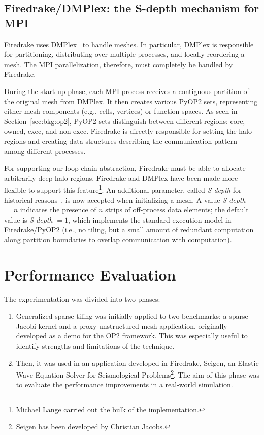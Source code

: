 \subsection{Firedrake/DMPlex: the S-depth mechanism for MPI}
\label{sec:tiling:impl-firedrake}
Firedrake uses DMPlex~\cite{dmplex} to handle meshes. In particular, DMPlex is responsible for partitioning, distributing over multiple processes, and locally reordering a mesh. The MPI parallelization, therefore, must completely be handled by Firedrake.

During the start-up phase, each MPI process receives a contiguous partition of the original mesh from DMPlex. It then creates various PyOP2 sets, representing either mesh components (e.g., cells, vertices) or function spaces. As seen in Section~\ref{sec:bkg:op2}, PyOP2 sets distinguish between different regions: core, owned, exec, and non-exec. Firedrake is directly responsible for setting the halo regions and creating data structures describing the communication pattern among different processes.

For supporting our loop chain abstraction, Firedrake must be able to allocate arbitrarily deep halo regions. Firedrake and DMPlex have been made more flexible to support this feature\footnote{Michael Lange carried out the bulk of the implementation.}. An additional parameter, called {\em S-depth} for historical reasons~\cite{s-depth-paper}, is now accepted when initializing a mesh. A value {\em S-depth} $= n$ indicates the presence of $n$ strips of off-process data elements; the default value is {\em S-depth} $ = 1$, which implements the standard execution model in Firedrake/PyOP2 (i.e., no tiling, but a small amount of redundant computation along partition boundaries to overlap communication with computation).


\section{Performance Evaluation}
The experimentation was divided into two phases:

\begin{enumerate}
\item Generalized sparse tiling was initially applied to two benchmarks: a sparse Jacobi kernel and a proxy unstructured mesh application, originally developed as a demo for the OP2 framework. This was especially useful to identify strengths and limitations of the technique.
\item Then, it was used in an application developed in Firedrake, Seigen, an Elastic Wave Equation Solver for Seismological Problems\footnote{Seigen has been developed by Christian Jacobs.}. The aim of this phase was to evaluate the performance improvements in a real-world simulation.
\end{enumerate}

